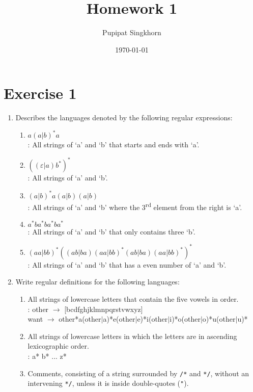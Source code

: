 \documentclass{article}
\begin{document}
\title{Homework 1}
\author{Pupipat Singkhorn}
\date{\today}
\maketitle

\section*{Exercise 1}

\begin{enumerate}
    \item Describes the languages denoted by the following regular expressions:
    \begin{enumerate}
        \item $a(a|b)^*a$\\
        : All strings of `a' and `b' that starts and ends with `a'.
        \item $((\varepsilon|a)b^*)^*$\\
        : All strings of `a' and `b'.
        \item $(a|b)^*a(a|b)(a|b)$\\
        : All strings of `a' and `b' where the 3\textsuperscript{rd} element from the right is `a'.
        \item $a^*ba^*ba^*ba^*$\\
        : All strings of `a' and `b' that only contains three `b'.
        \item $(aa|bb)^*((ab|ba)(aa|bb)^*(ab|ba)(aa|bb)^*)^*$\\
        : All strings of `a' and `b' that has a even number of `a' and `b'.
    \end{enumerate}
    \item Write regular definitions for the following languages:
    \begin{enumerate}
        \item All strings of lowercase letters that contain the five vowels in order.
        \\ : other $\rightarrow$ [bcdfghjklmnpqrstvwxyz]
        \\ want $\rightarrow$ other*a(other$\mid$a)*e(other$\mid$e)*i(other$\mid$i)*o(other$\mid$o)*u(other$\mid$u)*
        \item All strings of lowercase letters in which the letters are in ascending lexicographic order.
        \\ : a* b* ... z*
        \item Comments, consisting of a string surrounded by \texttt{/*} and \texttt{*/}, without an intervening \texttt{*/}, unless it is inside double-quotes (\texttt{"}).

\end{enumerate}
\end{enumerate}
\end{document}

